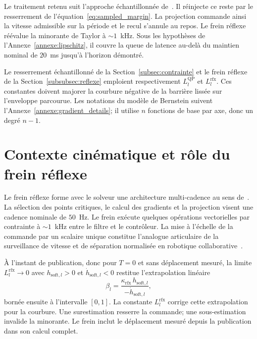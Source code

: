 Le traitement retenu suit l'approche échantillonnée de~\cite{Breeden2022Sampled}. Il réinjecte ce reste par le resserrement de l'équation~\eqref{eq:sampled_margin}. La projection commande ainsi la vitesse admissible sur la période et le recul s'annule au repos. Le frein réflexe réévalue la minorante de Taylor à ${\sim}1$~kHz. Sous les hypothèses de l'Annexe~\ref{annexe:lipschitz}, il couvre la queue de latence au-delà du maintien nominal de $20$~ms jusqu'à l'horizon démontré.

\label{annexe:lipschitz}

Le resserrement échantillonné de la Section~\ref{subsec:contrainte} et le frein réflexe de la Section~\ref{subsubsec:reflexe} emploient respectivement $L_l^{\mathrm{QP}}$ et $L_l^{\mathrm{rfx}}$. Ces constantes doivent majorer la courbure négative de la barrière lissée sur l'enveloppe parcourue. Les notations du modèle de Bernstein suivent l'Annexe~\ref{annexe:gradient_details}; il utilise $n$ fonctions de base par axe, donc un degré $n-1$.

\section*{Contexte cinématique et rôle du frein réflexe}

Le frein réflexe forme avec le solveur une architecture multi-cadence au sens de~\cite{Rosolia2022Unified}. La sélection des points critiques, le calcul des gradients et la projection visent une cadence nominale de $50$~Hz. Le frein exécute quelques opérations vectorielles par contrainte à ${\sim}1$~kHz entre le filtre et le contrôleur. La mise à l'échelle de la commande par un scalaire unique constitue l'analogue articulaire de la surveillance de vitesse et de séparation normalisée en robotique collaborative~\cite{Iso2016Robots}.

À l'instant de publication, donc pour $T=0$ et sans déplacement mesuré, la limite $L_l^{\mathrm{rfx}}\to0$ avec $h_{\mathrm{soft},l}>0$ et $\dot h_{\mathrm{soft},l}<0$ restitue l'extrapolation linéaire
\begin{equation}
\beta_l = \frac{\kappa_{\mathrm{rfx}}\,h_{\mathrm{soft},l}}{-\dot h_{\mathrm{soft},l}},
\end{equation}
bornée ensuite à l'intervalle $[0,1]$. La constante $L_l^{\mathrm{rfx}}$ corrige cette extrapolation pour la courbure. Une surestimation resserre la commande; une sous-estimation invalide la minorante. Le frein inclut le déplacement mesuré depuis la publication dans son calcul complet.

